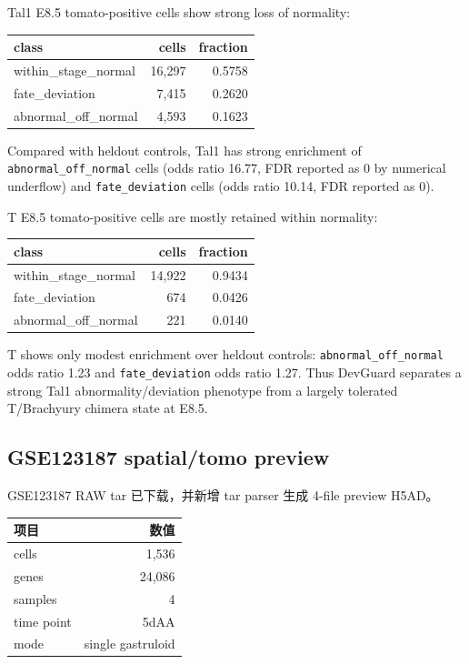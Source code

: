 \documentclass[11pt]{article}
\begin{document}
Tal1 E8.5 tomato-positive cells show strong loss of normality:

\begin{center}
\begin{tabular}{lrr}
\toprule
class & cells & fraction \\
\midrule
within\_stage\_normal & 16,297 & 0.5758 \\
fate\_deviation & 7,415 & 0.2620 \\
abnormal\_off\_normal & 4,593 & 0.1623 \\
\bottomrule
\end{tabular}
\end{center}

Compared with heldout controls, Tal1 has strong enrichment of \texttt{abnormal\_off\_normal} cells (odds ratio 16.77, FDR reported as 0 by numerical underflow) and \texttt{fate\_deviation} cells (odds ratio 10.14, FDR reported as 0).

T E8.5 tomato-positive cells are mostly retained within normality:

\begin{center}
\begin{tabular}{lrr}
\toprule
class & cells & fraction \\
\midrule
within\_stage\_normal & 14,922 & 0.9434 \\
fate\_deviation & 674 & 0.0426 \\
abnormal\_off\_normal & 221 & 0.0140 \\
\bottomrule
\end{tabular}
\end{center}

T shows only modest enrichment over heldout controls: \texttt{abnormal\_off\_normal} odds ratio 1.23 and \texttt{fate\_deviation} odds ratio 1.27. Thus DevGuard separates a strong Tal1 abnormality/deviation phenotype from a largely tolerated T/Brachyury chimera state at E8.5.

\subsection*{GSE123187 spatial/tomo preview}

GSE123187 RAW tar 已下载，并新增 tar parser 生成 4-file preview H5AD。

\begin{center}
\begin{tabular}{lr}
\toprule
项目 & 数值 \\
\midrule
cells & 1,536 \\
genes & 24,086 \\
samples & 4 \\
time point & 5dAA \\
mode & single gastruloid \\
\bottomrule
\end{tabular}
\end{center}
\end{document}
